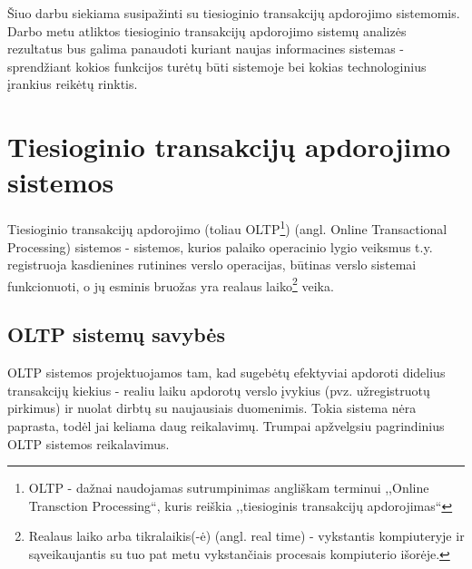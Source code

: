 \documentclass[12pt,a4paper,titlepage]{article}
\begin{document}
Šiuo darbu siekiama susipažinti su tiesioginio transakcijų apdorojimo sistemomis. Darbo metu atliktos tiesioginio transakcijų apdorojimo sistemų analizės rezultatus bus galima panaudoti kuriant naujas informacines sistemas - sprendžiant kokios funkcijos turėtų būti sistemoje bei kokias technologinius įrankius reikėtų rinktis.

\section{Tiesioginio transakcijų apdorojimo sistemos}

\begin{comment}
Online transactional processing (OLTP) is designed to efficiently process high volumes of transactions, instantly recording business events (such as a sales invoice payment) and reflecting changes as they occur.
\end{comment}

Tiesioginio transakcijų apdorojimo (toliau OLTP\footnote{OLTP - dažnai naudojamas sutrumpinimas angliškam terminui ,,Online Transction Processing``, kuris reiškia ,,tiesioginis transakcijų apdorojimas``}) (angl. Online Transactional Processing) sistemos - sistemos, kurios palaiko operacinio lygio veiksmus t.y. registruoja kasdienines rutinines verslo operacijas, būtinas verslo sistemai funkcionuoti, o jų esminis bruožas yra realaus laiko\footnote{Realaus laiko arba tikralaikis(-ė) (angl. real time) - vykstantis kompiuteryje ir sąveikaujantis su tuo pat metu vykstančiais procesais kompiuterio išorėje.\cite{DGJ08}} veika.

\subsection{OLTP sistemų savybės}

OLTP sistemos projektuojamos tam, kad sugebėtų efektyviai apdoroti didelius transakcijų kiekius - realiu laiku apdorotų verslo įvykius (pvz. užregistruotų pirkimus) ir nuolat dirbtų su naujausiais duomenimis. Tokia sistema nėra paprasta, todėl jai keliama daug reikalavimų. Trumpai apžvelgsiu pagrindinius OLTP sistemos reikalavimus.\\
\begin{comment}
The nature of OLTP environments is predominantly any kind of interactive ad hoc usage, such as telemarketeers entering telephone survey results. OLTP systems require short response times in order for users to remain productive.
\end{comment}
\end{document}
